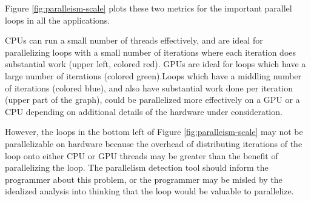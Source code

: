 \documentclass[12pt,twoside]{reedthesis}
\begin{document}
		Figure \ref{fig:paralleism-scale} plots these two metrics for the important parallel loops in all the applications. 
		
		CPUs can run a small number of threads effectively, and are ideal for parallelizing loops with a small number of iterations where each iteration does substantial work (upper left, colored red). GPUs are ideal for loops which have a large number of iterations (colored green).Loops which have a middling number of iterations (colored blue), and also have substantial work done per iteration (upper part of the graph), could be parallelized more effectively on a GPU or a CPU depending on additional details of the hardware under consideration. %
		
		
		However, the loops in the bottom left of Figure \ref{fig:paralleism-scale} may not be parallelizable on hardware because the overhead of distributing iterations of the loop onto either CPU or GPU threads may be greater than the benefit of parallelizing the loop. The parallelism detection tool should inform the programmer about this problem, or the programmer may be misled by the idealized analysis into thinking that the loop would be valuable to parallelize.
		
		
		
		
		
\end{document}
